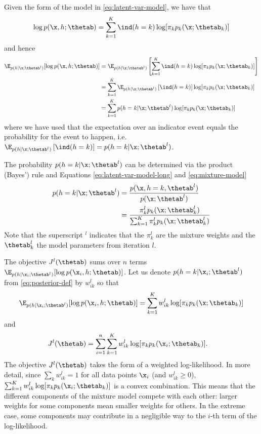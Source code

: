\begin{exenumerate}
\begin{solution}
    Given the form of the model in \eqref{eq:latent-var-model}, we have that
    \begin{align}
      \log p(\x, h; \thetab) = \sum_{k=1}^K \ind(h=k) \log[  \pi_k  p_k(\x; \thetab_k) ]
    \end{align}
    and hence
    \begin{align}
      \E_{p(h| \x; \thetab^l)}[ \log p(\x, h; \thetab)] &=  \E_{p(h| \x; \thetab^l)}\left[ \sum_{k=1}^K \ind(h=k) \log[  \pi_k  p_k(\x; \thetab_k) ] \right]\\
                                                        &=  \sum_{k=1}^K  \E_{p(h| \x; \thetab^l)}\left[ \ind(h=k) \right] \log[  \pi_k  p_k(\x; \thetab_k) ]\\
                                                        & = \sum_{k=1}^K p(h=k|\x; \thetab^l)  \log[  \pi_k  p_k(\x; \thetab_k) ]
    \end{align}
    where we have used that the expectation over an indicator event equals the
    probability for the event to happen, i.e.\ $\E_{p(h| \x; \thetab^l)}\left[
      \ind(h=k) \right] =  p(h=k|\x; \thetab^l)$.
    
    The probability  $p(h=k|\x; \thetab^l)$ can be determined via the product
    (Bayes') rule and Equations \eqref{eq:latent-var-model-long} and \eqref{eq:mixture-model}
    \begin{align}
      p(h=k|\x; \thetab^l) &= \frac{p(\x, h=k, \thetab^l)}{p(\x; \thetab^l)}\\
                           & = \frac{ \pi^l_k p_k(\x; \thetab^l_k)}{ \sum_{k=1}^K \pi^l_k p_k(\x; \thetab^l_k)}
                             \label{eq:posterior-def}
    \end{align}
    Note that the superscript $^l$ indicates that the $\pi_k^l$ are the mixture
    weights and the $\thetab^l_k$ the model parameters from iteration $l$.

    The objective $J^l(\thetab)$ sums over $n$ terms $ \E_{p(h| \x_i; \thetab^l)}[ \log p(\x_i, h;
    \thetab)]$. Let us denote $p(h=k|\x_i; \thetab^l)$ from \eqref{eq:posterior-def} by $w_{ik}^l$ so that
    \begin{equation}
      \E_{p(h| \x_i; \thetab^l)}[ \log p(\x_i, h; \thetab)] =  \sum_{k=1}^K w_{ik}^l  \log[  \pi_k  p_k(\x; \thetab_k) ]
    \end{equation}
    and
    \begin{align}
      J^l(\thetab) & = \sum_{i=1}^n  \sum_{k=1}^K w_{ik}^l  \log[  \pi_k  p_k(\x_i; \thetab_k) ].
    \end{align}
    The objective $J^l(\thetab)$ takes the form of a weighted log-likelihood. In
    more detail, since $\sum_k w_{ik}^l=1$ for all data points $\x_i$ (and
    $w_{ik}^l\ge 0 $), $ \sum_{k=1}^K w_{ik}^l \log[ \pi_k p_k(\x_i; \thetab_k)
    ]$ is a convex combination. This means that the different components of the
    mixture model compete with each other: larger weights for some
    components mean smaller weights for others. In the extreme case, some
    components may contribute in a negligible way to the $i$-th term of the
    log-likelihood.


\end{solution}
\end{exenumerate}
